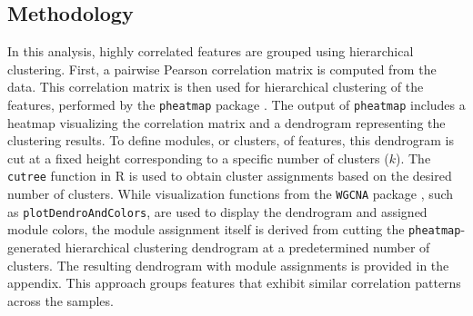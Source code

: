 \documentclass[12pt,a4paper]{report}
\begin{document}
\subsection{Methodology}
\noindent
In this analysis, highly correlated features are grouped using hierarchical clustering. First, a pairwise Pearson correlation matrix is computed from the data. This correlation matrix is then used for hierarchical clustering of the features, performed by the \texttt{pheatmap} package \cite{pheatmap_package}. The output of \texttt{pheatmap} includes a heatmap visualizing the correlation matrix and a dendrogram representing the clustering results. To define modules, or clusters, of features, this dendrogram is cut at a fixed height corresponding to a specific number of clusters ($k$). The \texttt{cutree} function in R is used to obtain cluster assignments based on the desired number of clusters. While visualization functions from the \texttt{WGCNA} package \cite{WGCNA}, such as \texttt{plotDendroAndColors}, are used to display the dendrogram and assigned module colors, the module assignment itself is derived from cutting the \texttt{pheatmap}-generated hierarchical clustering dendrogram at a predetermined number of clusters. The resulting dendrogram with module assignments is provided in the appendix. This approach groups features that exhibit similar correlation patterns across the samples.
\end{document}
